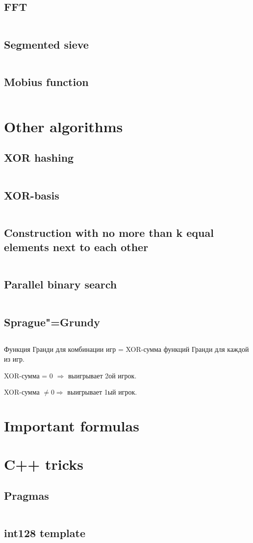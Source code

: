 ﻿\documentclass[a4paper,10pt,twocolumn,oneside]{article}
\begin{document}
\subsection{FFT}
\inputminted[breaklines]{python}{Maths/fft.cpp}
\subsection{Segmented sieve}
\inputminted[breaklines]{cpp}{Maths/segmented sieve.cpp}
\subsection{Mobius function}
\inputminted[breaklines]{cpp}{Maths/mobius.cpp}

\section{Other algorithms}
\subsection{XOR hashing}
\inputminted[breaklines]{cpp}{Other algorithms/xor-hashing.cpp}
\subsection{XOR-basis}
\inputminted[breaklines]{cpp}{Other algorithms/xor-basis.cpp}
\subsection{Construction with no more than k equal elements next to each other}
\inputminted[breaklines]{cpp}{Other algorithms/no equal neighbours.cpp}
\subsection{Parallel binary search}
\inputminted[breaklines]{cpp}{Other algorithms/parallel binsearch.cpp}
\subsection{Sprague"=Grundy}
\inputminted[breaklines]{cpp}{Other algorithms/sprague-grundy.cpp}

Функция Гранди для комбинации игр = XOR-сумма функций Гранди для каждой из игр.

XOR-сумма = 0 $\Rightarrow$ выигрывает 2ой игрок.

XOR-сумма $\ne 0 \Rightarrow$ выигрывает 1ый игрок.

\section{Important formulas}


\section{C++ tricks}
\subsection{Pragmas}
\inputminted[breaklines]{cpp}{cpp/pragmas.cpp}
\subsection{int128 template}
\inputminted[breaklines]{cpp}{cpp/int128.cpp}
\end{document}
